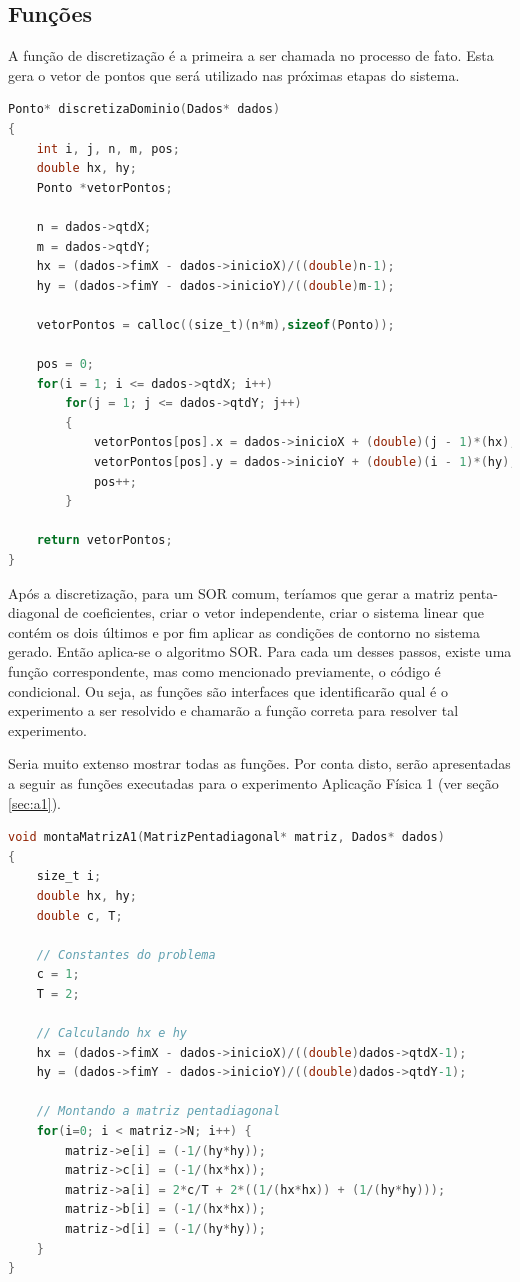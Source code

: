 \documentclass[
	11pt,				%
	oneside,			%
	a4paper,			%
	english,			%
	brazil,				%
	]{article}
\begin{document}
\subsection{Funções}

A função de discretização é a primeira a ser chamada no processo de fato. Esta 
gera o vetor de pontos que será utilizado nas próximas etapas do sistema.
\begin{lstlisting}[language=C, caption=Função de Discretização]
Ponto* discretizaDominio(Dados* dados)
{
	int i, j, n, m, pos;
	double hx, hy;
	Ponto *vetorPontos;

    n = dados->qtdX;
    m = dados->qtdY;
	hx = (dados->fimX - dados->inicioX)/((double)n-1);
	hy = (dados->fimY - dados->inicioY)/((double)m-1);

	vetorPontos = calloc((size_t)(n*m),sizeof(Ponto));

	pos = 0;
	for(i = 1; i <= dados->qtdX; i++)
		for(j = 1; j <= dados->qtdY; j++)
		{
			vetorPontos[pos].x = dados->inicioX + (double)(j - 1)*(hx);
			vetorPontos[pos].y = dados->inicioY + (double)(i - 1)*(hy);
			pos++;
		}

    return vetorPontos;
}
\end{lstlisting}

Após a discretização, para um SOR comum, teríamos que gerar a matriz 
penta-diagonal de coeficientes, criar o vetor independente, criar o sistema 
linear que contém os dois últimos e por fim aplicar as condições de contorno no 
sistema gerado. Então aplica-se o algoritmo SOR. Para cada um desses passos, 
existe uma função correspondente, mas como mencionado previamente, o código é 
condicional. Ou seja, as funções são interfaces que identificarão qual é o 
experimento a ser resolvido e chamarão a função correta para resolver tal 
experimento.

Seria muito extenso mostrar todas as funções. Por conta disto, serão 
apresentadas a seguir as funções executadas para o experimento Aplicação Física 
1 (ver seção \ref{sec:a1}).

\begin{lstlisting}[language=C, caption=Função Montar Matriz A1]
void montaMatrizA1(MatrizPentadiagonal* matriz, Dados* dados)
{
    size_t i;
    double hx, hy;
    double c, T;

    // Constantes do problema
    c = 1;
    T = 2;

    // Calculando hx e hy
	hx = (dados->fimX - dados->inicioX)/((double)dados->qtdX-1);
	hy = (dados->fimY - dados->inicioY)/((double)dados->qtdY-1);

    // Montando a matriz pentadiagonal
    for(i=0; i < matriz->N; i++) {
        matriz->e[i] = (-1/(hy*hy));
        matriz->c[i] = (-1/(hx*hx));
        matriz->a[i] = 2*c/T + 2*((1/(hx*hx)) + (1/(hy*hy)));
        matriz->b[i] = (-1/(hx*hx));
        matriz->d[i] = (-1/(hy*hy));
    }
}
\end{lstlisting}
\end{document}

